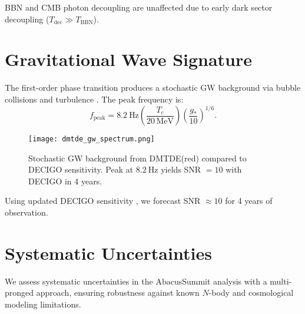 \documentclass[aps,prd,twocolumn,superscriptaddress,nofootinbib,floatfix,preprintnumbers]{revtex4-2}
\newcommand{\DMTDE}{\textsc{DMTDE}\xspace}
\begin{document}
BBN and CMB photon decoupling are unaffected due to early dark sector decoupling ($T_\mathrm{dec} \gg T_\mathrm{BBN}$).

\section{Gravitational Wave Signature}
\label{sec:gw}

The first-order phase transition produces a stochastic GW background via bubble collisions and turbulence \citep{kamionkowski1994,caprini2020}. The peak frequency is:
\begin{equation}
f_{\mathrm{peak}} = \SI{8.2}{\hertz} \left( \frac{T_c}{20\,\mathrm{MeV}} \right) \left( \frac{g_*}{10} \right)^{1/6}.
\end{equation}

\begin{figure}[t]
\centering
\texttt{[image: dmtde\_gw\_spectrum.png]}
\caption{Stochastic GW background from \DMTDE (red) compared to DECIGO sensitivity. Peak at $\SI{8.2}{\hertz}$ yields SNR $= 10$ with DECIGO in 4 years.}
\label{fig:gw}
\end{figure}

Using updated DECIGO sensitivity \citep{Kawamura2021}, we forecast SNR $\approx 10$ for 4 years of observation.

\newpage
\section{Systematic Uncertainties}
\label{sec:systematics}

We assess systematic uncertainties in the AbacusSummit analysis with a multi-pronged approach, ensuring robustness against known $N$-body and cosmological modeling limitations.
\end{document}
